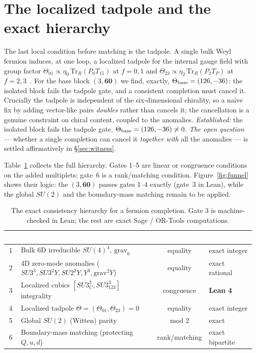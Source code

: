 \documentclass[11pt,a4paper]{article}
\newcommand{\Tr}{\mathrm{Tr}}
\begin{document}
\section{The localized tadpole and the exact hierarchy}\label{sec:tadpole}
The last local condition before matching is the tadpole. A single bulk Weyl fermion
induces, at one loop, a localized tadpole for the internal gauge field with group
factor $\Theta_{01}\propto\eta_0\,\Tr_R(P_0 T_{15})$ at $f=0,1$ and
$\Theta_{23}\propto\eta_2\,\Tr_R(P_2 T_P)$ at $f=2,3$~\cite{BiggioQ}. For the base block
$(3,\mathbf{60})$ we find, exactly, $\Theta_{\rm base}=(126,-36)$: the isolated block
fails the tadpole gate, and a consistent completion must cancel it. Crucially the
tadpole is independent of the six-dimensional chirality, so a naive fix by adding
vector-like pairs \emph{doubles} rather than cancels it; the cancellation is a genuine
constraint on chiral content, coupled to the anomalies.
\emph{Established:} the isolated block fails the tadpole gate, $\Theta_{\rm
base}=(126,-36)\neq0$. \emph{The open question} --- whether a single completion can
cancel it \emph{together with} all the anomalies --- is settled affirmatively in
\S\ref{sec:witness}.

Table~\ref{tab:gates} collects the full hierarchy. Gates 1--5 are linear or congruence
conditions on the added multiplets; gate~6 is a rank/matching condition. Figure~\ref{fig:funnel}
shows their logic: the $(3,\mathbf{60})$ passes gates 1--4 exactly (gate~3 in Lean),
while the global $SU(2)$ and the boundary-mass matching remain to be applied.

\begin{table}[t]
\centering\footnotesize
\begin{tabular}{clcl}
\toprule
\rowcolor{hdrblue}
\textcolor{white}{\#} & \textcolor{white}{Condition} & \textcolor{white}{Type} & \textcolor{white}{Certificate}\\
\midrule
\rowcolor{softgrey}
1 & Bulk 6D irreducible $SU(4)^4$, $\mathrm{grav}_6$ & equality & exact integer\\
2 & 4D zero-mode anomalies ($SU3^3,SU3^2Y,SU2^2Y,Y^3,\mathrm{grav}^2Y$) & equality & exact rational\\
\rowcolor{softgrey}
3 & Localized cubics $[SU3_C^3,SU3_{123}^3]$ integrality & congruence & \textbf{\color{okgreen}Lean 4}\\
4 & Localized tadpole $\Theta=(\Theta_{01},\Theta_{23})=0$ & equality & exact integer\\
\rowcolor{softgrey}
5 & Global $SU(2)$ (Witten) parity & mod 2 & exact\\
6 & Boundary-mass matching (protecting $Q,u,d$) & rank/matching & exact bipartite\\
\bottomrule
\end{tabular}
\caption{The exact consistency hierarchy for a fermion completion. Gate 3 is
machine-checked in Lean; the rest are exact Sage / OR-Tools computations.}
\label{tab:gates}
\end{table}
\end{document}
